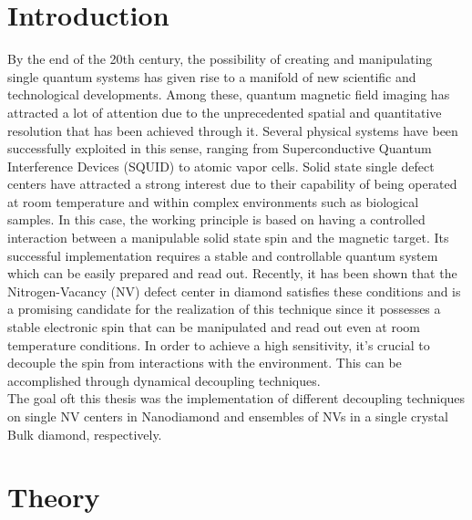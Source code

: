 \documentclass[12pt,a4paper]{article}
\begin{document}

 

\maketitle

\thispagestyle{empty}
\newpage

\tableofcontents
\thispagestyle{empty}
\newpage
{}

\section{Introduction}
By the end of the 20th century, the possibility of creating and manipulating single quantum systems has given rise to a manifold of new scientific and technological developments. Among these, quantum magnetic field imaging has attracted a lot of attention due to the unprecedented spatial and quantitative resolution that has been achieved through it. Several physical systems have been successfully exploited in this sense, ranging from Superconductive Quantum Interference Devices (SQUID)\cite{squid} to atomic vapor cells\cite{avc}. Solid state single defect centers have attracted a strong interest due to their capability of being operated at room temperature and within complex environments such as biological samples. In this case, the working principle is based on having a controlled interaction between a manipulable solid state spin and the magnetic target. Its successful implementation requires a stable and controllable quantum system which can be easily prepared and read out. Recently, it has been shown that the Nitrogen-Vacancy (NV) defect center in diamond satisfies these conditions and is a promising candidate for the realization of this technique since it possesses a stable electronic spin that can be manipulated and read out even at room temperature conditions\cite{nvref}. In order to achieve a high sensitivity, it's crucial to decouple the spin from interactions with the environment. This can be accomplished through dynamical decoupling techniques.\\
The goal oft this thesis was the implementation of different decoupling techniques on single NV centers in Nanodiamond and ensembles of NVs in a single crystal Bulk diamond, respectively.
\section{Theory}
\end{document}
